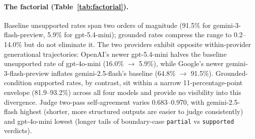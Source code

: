 \documentclass{article}
\theoremstyle{plain}
\begin{document}
\paragraph{The factorial (Table~\ref{tab:factorial}).}
Baseline unsupported rates span two orders of magnitude (91.5\% for gemini-3-flash-preview, 5.9\% for gpt-5.4-mini); grounded rates compress the range to 0.2--14.0\% but do not eliminate it. The two providers exhibit opposite within-provider generational trajectories: OpenAI's newer gpt-5.4-mini halves the baseline unsupported rate of gpt-4o-mini (16.0\% $\to$ 5.9\%), while Google's newer gemini-3-flash-preview inflates gemini-2.5-flash's baseline (64.8\% $\to$ 91.5\%). Grounded-condition supported rates, by contrast, sit within a narrow 11-percentage-point envelope (81.9--93.2\%) across all four models and provide no visibility into this divergence. Judge two-pass self-agreement varies 0.683--0.970, with gemini-2.5-flash highest (shorter, more structured outputs are easier to judge consistently) and gpt-4o-mini lowest (longer tails of boundary-case \texttt{partial} vs \texttt{supported} verdicts).

\begin{table}[!t]
\centering
\small
\setlength{\tabcolsep}{4pt}
\caption{Cross-condition diagnostic panel. HDI (Eq.~\ref{eq:hdi}) is the relative reduction in unsupported-claim rate from grounding; $\Delta u = u_b - u_g$ (percentage points) is the corresponding absolute reduction. Reporting both is intentional: HDI is structurally noisy when $u_b$ is small (gpt-5.4-mini's HDI 0.336 corresponds to only 1.9~pp absolute), while $\Delta u$ alone hides that gemini-3's grounded condition still leaves 14.0\% of claims unsupported despite the 77.5~pp drop. Overlap@0.80 is the cohort-mean fraction of grounded claims with a same-patient baseline twin at cosine $\geq 0.80$; Max-sim is the mean of the maximum cosine similarity per grounded claim.}
\label{tab:panel}
\end{table}
\end{document}
